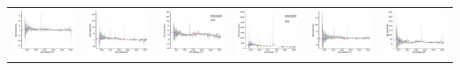 \begin{center}
\begin{longtable}{l l l l l l }
    \includegraphics[width=0.3\linewidth, clip]{Figs/Figs-lamost/spec-55859-F5907_sp14-024-STRIPE82-0062-010390.pdf} & \includegraphics[width=0.3\linewidth, clip]{Figs/Figs-lamost/spec-55859-F5907_sp15-171-STRIPE82-0064-031755.pdf} & \includegraphics[width=0.3\linewidth, clip]{Figs/Figs-lamost/spec-55859-F5907_sp16-143-STRIPE82-0064-069216.pdf} & \includegraphics[width=0.3\linewidth, clip]{Figs/Figs-lamost/spec-55893-F9304_sp12-121-STRIPE82-0059-052699.pdf} & \includegraphics[width=0.3\linewidth, clip]{Figs/Figs-lamost/spec-55915-F5591503_sp12-098-STRIPE82-0063-036294.pdf} & \includegraphics[width=0.3\linewidth, clip]{Figs/Figs-lamost/spec-55915-F5591503_sp13-115-STRIPE82-0065-022216.pdf} \\

\end{longtable}
\end{center}
